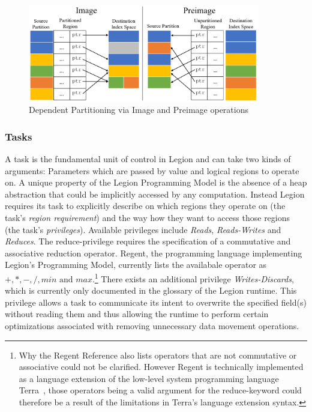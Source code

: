 \documentclass{article}      %
\begin{document}
\begin{figure}[htb]
	\centering
	\includegraphics[width=0.9\textwidth]{images/image_preimage}
	\caption{Dependent Partitioning via Image and Preimage operations}\label{fig:image_preimage}
\end{figure}

\subsubsection{Tasks}\label{sec:tasks}
A task is the fundamental unit of control in Legion and can take two kinds of arguments: Parameters which are passed by value and logical regions to operate on.
A unique property of the Legion Programming Model is the absence of a heap abstraction that could be implicitly accessed by any computation. Instead Legion requires its task to explicitly describe on which regions they operate on (the task's \emph{region requirement}) and the way how they want to access those regions (the task's \emph{privileges}). 
Available privileges include \emph{Reads}, \emph{Reads-Writes} and \emph{Reduces}. 
The reduce-privilege requires the specification of a commutative and associative reduction operator.
Regent, the programming language implementing Legion's Programming Model, currently lists the availabale operator as $+, *, -, /, min \text{ and } max$.\footnote{Why the Regent Reference also lists operators that are not commutative or associative could not be clarified. 
However Regent is technically implemented as a language extension of the low-level system programming language Terra~\cite{Terra}, those operators being a valid argument for the reduce-keyword could therefore be a result of the limitations in Terra's language extension syntax.} 
There exists an additional privilege \emph{Writes-Discards}, which is currently only documented in the glossary of  the Legion runtime. 
This privilege allows a task to communicate its intent to overwrite the specified field(s) without reading them and thus allowing the runtime to perform certain optimizations associated with removing unnecessary data movement operations.
\end{document}
